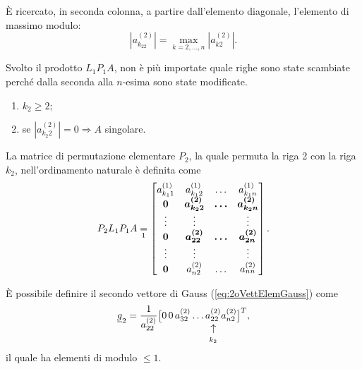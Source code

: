 È ricercato, in seconda colonna, a partire dall'elemento diagonale, l'elemento di massimo modulo:
\begin{equation*}
    \left|a_{k_22}^{(2)}\right| = \underset{k=2,\hdots, n}{\max}\left|a_{k2}^{(2)}\right|.
\end{equation*}

Svolto il prodotto $L_1 P_1 A$, non è più importate quale righe sono state scambiate perché dalla seconda alla $n$-esima sono state modificate.

\begin{remark}
    \begin{enumerate}
        \item $k_2\geq 2;$
        \item se $\left|a_{k_2 2}^{(2)}\right|=0\Rightarrow A$ singolare.
    \end{enumerate}
\end{remark}

La matrice di permutazione elementare $P_2$, la quale permuta la riga 2 con la riga $k_2$, nell'ordinamento naturale è definita come
\begin{equation*}
    P_2 L_1 P_1 A \underset{\footnotemark}{=}
    \begin{bmatrix}
        a_{k_11}^{(1)} & a_{k_12}^{(1)} & \hdots & a_{k_1n}^{(1)}\\
        \boldsymbol 0 & \boldsymbol{a_{k_22}^{(2)}} & \boldsymbol\hdots & \boldsymbol{a_{k_2n}^{(2)}}\\
        \boldsymbol\vdots & \vdots & & \vdots\\
        \boldsymbol 0 & \boldsymbol{a_{22}^{(2)}} & \boldsymbol\hdots & \boldsymbol{a_{2n}^{(2)}}\\
        \boldsymbol\vdots & \vdots & & \vdots\\
        \boldsymbol 0 & a_{n2}^{(2)} & \hdots & a_{nn}^{(2)}
    \end{bmatrix}.
\end{equation*}

È possibile definire il secondo vettore di Gauss (\ref{eq:2oVettElemGauss}) come
\begin{equation*}
    \uline g_2 = \frac{1}{a_{22}^{(2)}}\big[0\, 0\, a_{32}^{(2)}\hdots\vrightarrowup{a_{22}^{(2)}}{k_2} a_{n2}^{(2)}\big]^T,
\end{equation*}
il quale ha elementi di modulo $\leq 1$.

